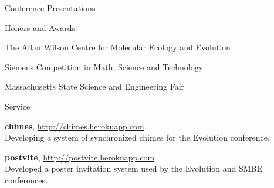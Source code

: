 \documentclass[12pt]{tracv}
\begin{document}
    \begin{columnsection}{Conference Presentations}








    \end{columnsection}

    \begin{columnsection}{Honors and Awards}

        The Allan Wilson Centre for Molecular Ecology and Evolution

        Siemens Competition in Math, Science and Technology

        Massachusetts State Science and Engineering Fair

    \end{columnsection}

    \begin{hangingsection}{Service}

        \hangingentry \textbf{chimes}, \url{http://chimes.herokuapp.com} \\
        Developing a system of synchronized chimes for the Evolution conference.

        \hangingentry \textbf{postvite}, \url{http://postvite.herokuapp.com} \\
        Developed a poster invitation system used by the Evolution and SMBE conferences.

    \end{hangingsection}
\end{document}
